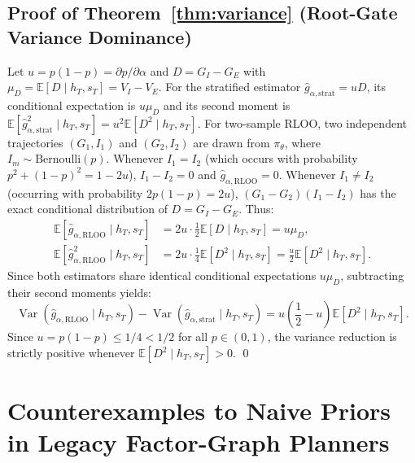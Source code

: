 \documentclass[11pt]{article}
\theoremstyle{definition}
\theoremstyle{remark}
\newcommand{\E}{\mathbb{E}}
\newcommand{\Var}{\operatorname{Var}}
\begin{document}
\subsection{Proof of Theorem~\ref{thm:variance} (Root-Gate Variance Dominance)}
Let $u = p(1-p) = \partial p / \partial \alpha$ and $D = G_I - G_E$ with $\mu_D = \E[D \mid h_T, s_T] = V_I - V_E$.
For the stratified estimator $\widehat{g}_{\alpha, \mathrm{strat}} = u D$, its conditional expectation is $u \mu_D$ and its second moment is $\E[\widehat{g}_{\alpha, \mathrm{strat}}^2 \mid h_T, s_T] = u^2 \E[D^2 \mid h_T, s_T]$.
For two-sample RLOO, two independent trajectories $(G_1, I_1)$ and $(G_2, I_2)$ are drawn from $\pi_\theta$, where $I_m \sim \mathrm{Bernoulli}(p)$. Whenever $I_1 = I_2$ (which occurs with probability $p^2 + (1-p)^2 = 1 - 2u$), $I_1 - I_2 = 0$ and $\widehat{g}_{\alpha, \mathrm{RLOO}} = 0$. Whenever $I_1 \neq I_2$ (occurring with probability $2p(1-p) = 2u$), $(G_1 - G_2)(I_1 - I_2)$ has the exact conditional distribution of $D = G_I - G_E$. Thus:
\begin{align}
    \E[\widehat{g}_{\alpha, \mathrm{RLOO}} \mid h_T, s_T] &= 2u \cdot \frac{1}{2}\E[D \mid h_T, s_T] = u \mu_D, \\
    \E[\widehat{g}_{\alpha, \mathrm{RLOO}}^2 \mid h_T, s_T] &= 2u \cdot \frac{1}{4}\E[D^2 \mid h_T, s_T] = \frac{u}{2}\E[D^2 \mid h_T, s_T].
\end{align}
Since both estimators share identical conditional expectations $u \mu_D$, subtracting their second moments yields:
\begin{equation}
    \Var(\widehat{g}_{\alpha, \mathrm{RLOO}} \mid h_T, s_T) - \Var(\widehat{g}_{\alpha, \mathrm{strat}} \mid h_T, s_T) = u\left(\frac{1}{2} - u\right)\E[D^2 \mid h_T, s_T].
\end{equation}
Since $u = p(1-p) \le 1/4 < 1/2$ for all $p \in (0, 1)$, the variance reduction is strictly positive whenever $\E[D^2 \mid h_T, s_T] > 0$. \qed

\section{Counterexamples to Naive Priors in Legacy Factor-Graph Planners}
\label{app:counterexamples}
\end{document}

